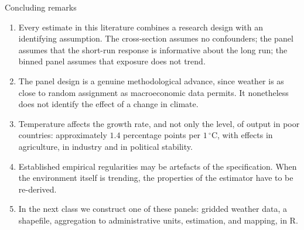 \documentclass[aspectratio=169,10pt]{beamer}
\begin{document}
\begin{frame}{Concluding remarks}
  \begin{enumerate}
    \item Every estimate in this literature combines a research design with an
          identifying assumption. The cross-section assumes no confounders; the panel
          assumes that the short-run response is informative about the long run; the
          binned panel assumes that exposure does not trend.
    \item The panel design is a genuine methodological advance, since weather is as
          close to random assignment as macroeconomic data permits. It nonetheless does
          not identify the effect of a change in climate.
    \item Temperature affects the growth rate, and not only the level, of output in
          poor countries: approximately $1.4$ percentage points per $1\,^\circ$C, with
          effects in agriculture, in industry and in political stability.
    \item Established empirical regularities may be artefacts of the specification.
          When the environment itself is trending, the properties of the estimator have
          to be re-derived.
    \item In the next class we construct one of these panels: gridded weather data, a
          shapefile, aggregation to administrative units, estimation, and mapping, in R.
  \end{enumerate}
\end{frame}
\end{document}
